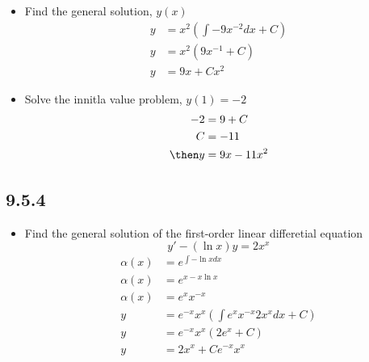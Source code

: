 \begin{itemize}
\begin{itemize}
\begin{itemize}
        \item Find the general solution, \(y(x)\)
          \begin{align*}
            y &= x^2 \left( \int -9x^{-2} dx + C\right)  \\
            y &= x^2 (9x^{-1} + C) \\
            y &= 9x + Cx^2
          \end{align*}

        \item Solve the innitla value problem, \(y(1) = -2\)
          \begin{align*}
            -2 &= 9 + C \\
            C &= -11 \\
            \then
            y &= 9x - 11x^2
          \end{align*}
      \end{itemize}
  \end{itemize}

  \subsection{9.5.4}
  \begin{itemize}
    \item Find the general solution of the first-order linear differetial
      equation
      \[%
        y' - (\ln x)y = 2x^{x}
      \]%
      \begin{align*}
        \alpha (x) &= e^{\int -\ln x dx} \\
        \alpha (x) &= e^{x-x\ln x} \\
        \alpha (x) &= e^x x^{-x} \\
        y &= e^{-x}x^x \left( \int e^x x^{-x} 2x^x dx + C \right)  \\
        y &= e^{-x}x^x (2e^x + C) \\
        y &= 2x^x + Ce^{-x}x^{x}
      \end{align*}
  \end{itemize}


\end{itemize}
